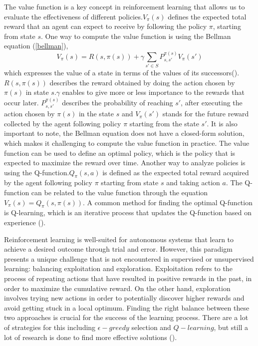 The value function is a key concept in reinforcement learning that allows us to evaluate the effectiveness of different policies.$V_{\pi}(s)$ defines the expected total reward that an agent can expect to receive by following the policy $\pi$, starting from state $s$. One way to compute the value function is using the Bellman equation (\ref{bellman}),
\begin{equation}\label{bellman}
V_{\pi}(s) = R(s, \pi(s)) + \gamma \sum_{s' \in S} P_{s, s'}^{\pi(s)} V_{\pi}(s')
\end{equation}
which expresses the value of a state in terms of the values of its successors(\cite{barron_bellman_1989}). $R(s, \pi(s))$ describes the reward obtained by doing the action chosen by $\pi(s)$ in state $s$.$\gamma$ enables to give more or less importance to the rewards that occur later. $ P_{s, s'}^{\pi(s)}$ describes the probability of reaching $s'$, after executing the action chosen by $\pi(s)$ in the state $s$ and $V_{\pi}(s')$ stands for the future reward collected by the agent following policy $\pi$ starting from the state $s'$. It is also important to note, the Bellman equation does not have a closed-form solution, which makes it challenging to compute the value function in practice.
The value function can be used to define an optimal policy, which is the policy that is expected to maximize the reward over time. Another way to analyze policies is using the Q-function.$Q_{\pi}(s, a)$ is defined as the expected total reward acquired by the agent following policy $\pi$ starting from state $s$ and taking action $a$. The Q-function can be related to the value function through the equation $V_{\pi}(s) = Q_{\pi}(s, \pi(s))$. A common method for finding the optimal Q-function is Q-learning, which is an iterative process that updates the Q-function based on experience (\cite{watkins_q-learning_1992}). 


Reinforcement learning is well-suited for autonomous systems that learn to achieve a desired outcome through trial and error. However, this paradigm presents a unique challenge that is not encountered in supervised or unsupervised learning: balancing exploitation and exploration. Exploitation refers to the process of repeating actions that have resulted in positive rewards in the past, in order to maximize the cumulative reward. On the other hand, exploration involves trying new actions in order to potentially discover higher rewards and avoid getting stuck in a local optimum. Finding the right balance between these two approaches is crucial for the success of the learning process. There are a lot of strategies for this including $\epsilon - greedy$ selection and $Q-learning$, but still a lot of research is done to find more effective solutions (\cite{coggan_exploration_nodate}).

